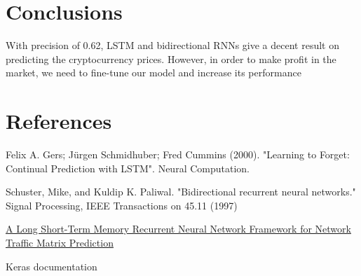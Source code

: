 \documentclass[a4paper,11pt]{article}
\begin{document}
\section{Conclusions}


With precision of 0.62, LSTM and bidirectional RNNs give a decent result on predicting the cryptocurrency prices. However, in order to make profit in the market, we need to fine-tune our model and increase its performance

\section{References}



Felix A. Gers; Jürgen Schmidhuber; Fred Cummins (2000). "Learning to Forget: Continual Prediction with LSTM". Neural Computation. 


Schuster, Mike, and Kuldip K. Paliwal. "Bidirectional recurrent neural networks." Signal Processing, IEEE Transactions on 45.11 (1997)


\href{https://arxiv.org/pdf/1705.05690.pdf}{A Long Short-Term Memory Recurrent Neural Network Framework for Network Traffic Matrix Prediction}


Keras documentation
\end{document}
